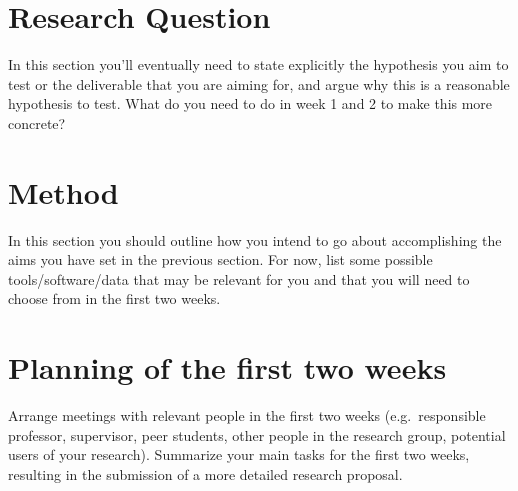 \documentclass[english, a4paper, 11pt]{article}
\begin{document}
\section*{Research Question}
In this section you'll eventually need to state explicitly the hypothesis you aim to test or the deliverable that you are aiming for, and argue why this is a reasonable hypothesis to test.
What do you need to do in week 1 and 2 to make this more concrete?

\section*{Method}
In this section you should outline how you intend to go about accomplishing the aims you have set in the previous section. 
For now, list some possible tools/software/data that may be relevant for you and that you will need to choose from in the first two weeks.

\section*{Planning of the first two weeks}
Arrange meetings with relevant people in the first two weeks (e.g.\ responsible professor, supervisor, peer students, other people in the research group, potential users of your research).
Summarize your main tasks for the first two weeks, resulting in the submission of a more detailed research proposal.

\printbibliography
\end{document}

